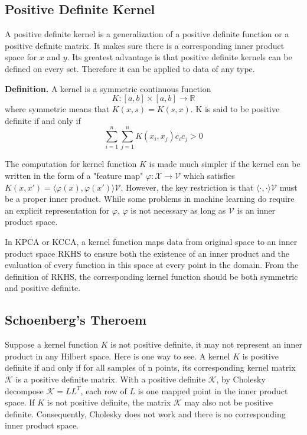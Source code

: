 \documentclass[12pt]{report} %
\begin{document}
\subsection{Positive Definite Kernel}
A positive definite kernel is a generalization of a positive definite function or a positive definite matrix. It makes sure there is a corresponding inner product space for $x$ and $y$. Its greatest advantage is that positive definite kernels can be defined on every set. Therefore it can be applied to data of any type.

\textbf{Definition.}\cite{MT} A kernel is a symmetric continuous function
\begin{equation}
K:[a,b] \times [a,b] \rightarrow \mathbb {R}
\end{equation}
where symmetric means that \( K(x, s) = K(s, x)\).
K is said to be positive definite if and only if
\begin{equation}
\sum _{i=1}^{n}\sum _{j=1}^{n}K(x_{i},x_{j})c_{i}c_{j} > 0
\end{equation}

The computation for kernel function $K$ is made much simpler if the kernel can be written in the form of a "feature map" $\varphi:\mathcal{X}\to\mathcal{V}$ which satisfies $K(x,x')=\langle \varphi (x), \varphi (x') \rangle \mathcal{V}$. However, the key restriction is that $\langle \cdot, \cdot \rangle \mathcal{V}$ must be a proper inner product. While some problems in machine learning do require an explicit representation for $\varphi$, $\varphi$ is not necessary as long as $\mathcal{V}$ is an inner product space\cite{PD}.

In KPCA or KCCA, a kernel function maps data from original space to an inner product space RKHS to ensure both the existence of an inner product and the evaluation of every function in this space at every point in the domain. From the definition of RKHS, the corresponding kernel function should be both symmetric and positive definite\cite{RKHS}.

\subsection{Schoenberg's Theroem}
Suppose a kernel function $K$ is not positive definite, it may not represent an inner product in any Hilbert space. Here is one way to see. A kernel $K$ is positive definite if and only if for all samples of n points, its corresponding kernel matrix $\mathcal{K}$ is a positive definite matrix. With a positive definite $\mathcal{K}$, by Cholesky decompose $\mathcal{K}=LL^T$, each row of $L$ is one mapped point in the inner product space. If $K$ is not positive definite, the matrix $\mathcal{K}$ may also not be positive definite. Consequently, Cholesky does not work and there is no corresponding inner product space. 
\end{document}
